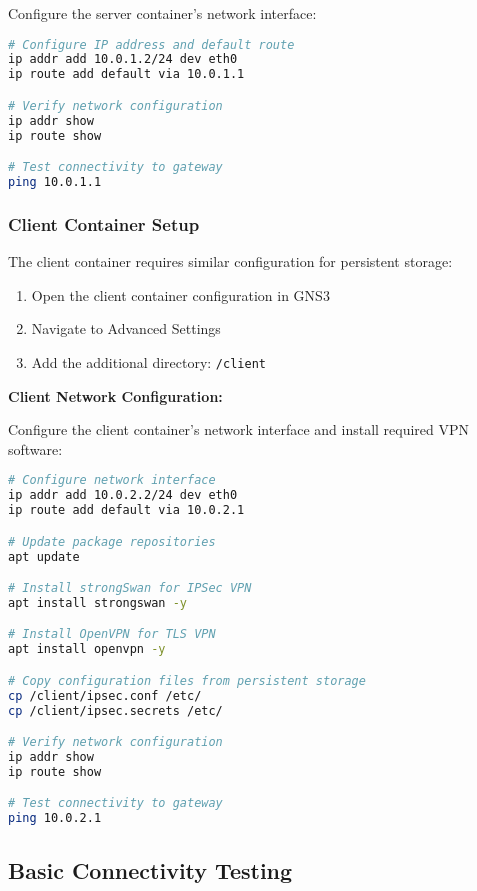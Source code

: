 Configure the server container's network interface:

\begin{lstlisting}[language=bash]
# Configure IP address and default route
ip addr add 10.0.1.2/24 dev eth0
ip route add default via 10.0.1.1

# Verify network configuration
ip addr show
ip route show

# Test connectivity to gateway
ping 10.0.1.1
\end{lstlisting}

\subsubsection{Client Container Setup}

The client container requires similar configuration for persistent storage:

\begin{enumerate}
    \item Open the client container configuration in GNS3
    \item Navigate to Advanced Settings  
    \item Add the additional directory: \texttt{/client}
\end{enumerate}

\textbf{Client Network Configuration:}

Configure the client container's network interface and install required VPN software:

\begin{lstlisting}[language=bash]
# Configure network interface
ip addr add 10.0.2.2/24 dev eth0
ip route add default via 10.0.2.1

# Update package repositories
apt update

# Install strongSwan for IPSec VPN
apt install strongswan -y

# Install OpenVPN for TLS VPN  
apt install openvpn -y

# Copy configuration files from persistent storage
cp /client/ipsec.conf /etc/
cp /client/ipsec.secrets /etc/

# Verify network configuration
ip addr show
ip route show

# Test connectivity to gateway
ping 10.0.2.1
\end{lstlisting}

\subsection{Basic Connectivity Testing}

